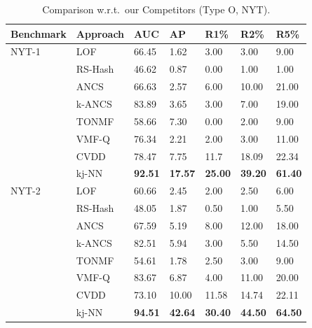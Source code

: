 \begin{table} %
\renewrobustcmd{\boldmath}{}
    \centering
    \caption{Comparison w.r.t.\ our Competitors (Type O, NYT).}
    \label{result:nyt_typeA}
    \addtolength{\tabcolsep}{-2pt}
    \centering
    \footnotesize
\renewcommand{\arraystretch}{0.68}
    \begin{tabularx}{\columnwidth}{@{}XXXXXXX@{}}
\toprule
Benchmark   & Approach & \gls{AUC} & \gls{AP} & R1\% & R2\% & R5\% \\ \midrule
NYT-1   & \gls{LOF}      & 66.45 &	1.62 &	3.00 &	3.00 &	9.00 \\
        & \gls{RS-Hash}  & 46.62   & 0.87   & 0.00        & 1.00        & 1.00  \\
        & \gls{ANCS}      & 66.63   & 2.57   & 6.00        & 10.00       & 21.00 \\
        & \gls{k-ANCS}    & 83.89  &	3.65 &	3.00 &	7.00 &	19.00 	 \\
        & \gls{TONMF}    & 58.66 	& 7.30 	 & 0.00 	       & 2.00 	     & 9.00 \\
        & \gls{VMF-Q}    & 76.34   & 2.21   &  2.00          & 3.00           & 11.00  \\
        & \gls{CVDD}     & 78.47 &	7.75&	11.7 & 18.09	 & 22.34  \\
        & \gls{kj-NN} &\bfseries 92.51 &\bfseries	17.57 &\bfseries	25.00 &\bfseries	39.20 &\bfseries	61.40 \\ \midrule


NYT-2   & \gls{LOF}      & 60.66  &	2.45 &	2.00 &	2.50 &	6.00   \\   
        & \gls{RS-Hash}  & 48.05   & 1.87   & 0.50    & 1.00  &  5.50   \\
        & \gls{ANCS}      & 67.59   & 5.19   & 8.00    & 12.00 & 18.00   \\
        & \gls{k-ANCS}    & 82.51  &	5.94 &	3.00 &	5.50 &	14.50    \\    
        & \gls{TONMF}    & 54.61 	 & 1.78   & 2.50 	& 3.00 	& 9.00 	 \\           
        & \gls{VMF-Q}    & 83.67   & 6.87   & 4.00    & 11.00 & 20.00   \\
        & \gls{CVDD}     & 73.10 &	10.00 &	11.58&	14.74 &	22.11  \\
        & \gls{kj-NN}    & \bfseries 94.51 &\bfseries	42.64 &\bfseries	30.40 &\bfseries	44.50 &\bfseries	64.50   \\    \midrule


\end{tabularx}
\end{table}

